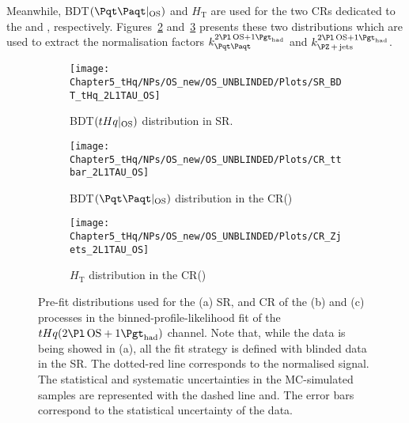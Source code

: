 Meanwhile, BDT$(\ttbar|_{\text{OS}})$ and $H_{\text{T}}$ are used for the two CRs dedicated to the \ttbar and \Zjets, respectively.
Figures~\ref{fig:ChaptH:PreFit:OS:CR_tt} and~\ref{fig:ChaptH:PreFit:OS:CR_zjets} presents these two distributions which are used to extract the normalisation factors $k_{\ttbar}^{\dilepOStau}$
and $k_{\Zjets}^{\dilepOStau}$.




\begin{figure}[h]
\centering
\begin{subfigure}{.5\textwidth}
  \centering
  \texttt{[image: Chapter5\_tHq/NPs/OS\_new/OS\_UNBLINDED/Plots/SR\_BDT\_tHq\_2L1TAU\_OS]}
  \caption{BDT$(tHq|_{\text{OS}})$ distribution in SR.}
  \label{fig:ChaptH:PreFit:OS:SR}
\end{subfigure}%
\hfill
\begin{subfigure}{.5\textwidth}
  \centering
  \texttt{[image: Chapter5\_tHq/NPs/OS\_new/OS\_UNBLINDED/Plots/CR\_ttbar\_2L1TAU\_OS]}
  \caption{BDT$(\ttbar|_{\text{OS}})$ distribution in the CR(\ttbar)}
  \label{fig:ChaptH:PreFit:OS:CR_tt}
\end{subfigure}%
\hfill
\begin{subfigure}{.5\textwidth}
  \centering
  \texttt{[image: Chapter5\_tHq/NPs/OS\_new/OS\_UNBLINDED/Plots/CR\_Zjets\_2L1TAU\_OS]}
  \caption{$H_{\text{T}}$ distribution in the CR(\Zjets)}
  \label{fig:ChaptH:PreFit:OS:CR_zjets}
\end{subfigure}%
\caption{Pre-fit distributions used for the (a) \tHq SR, and CR of the (b) \ttbar and (c) \Zjets processes in the
binned-profile-likelihood fit of the $\tHq(\dilepOStau)$ channel.
Note that, while the data is being showed in (a), all the fit strategy is defined with blinded data in the SR.
The dotted-red line corresponds to the normalised \tHq signal.
The statistical and systematic uncertainties in the MC-simulated samples are represented with the dashed line
and. The error bars correspond to the statistical uncertainty of the data.}
\label{fig:ChaptH:PreFit:OS:SR_CRs}
\end{figure}


